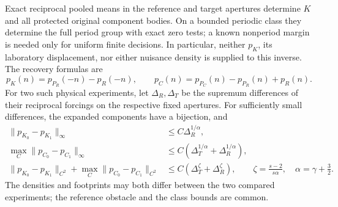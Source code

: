 \begin{theorem}
\label{thm:reference-exact}
Exact reciprocal pooled means in the reference and target apertures
determine $K$ and all protected original component bodies. On a
bounded periodic class they determine the full period group with exact
zero tests; a known nonperiod margin is needed only for uniform finite
decisions. In particular, neither $p_K$, its laboratory displacement,
nor either nuisance density is supplied to this inverse. The recovery
formulas are
\begin{equation}\label{eq:reference-subtraction}
 p_K(n)=p_{P_R}(-n)-p_R(-n),\qquad
 p_C(n)=p_{P_C}(n)-p_{P_R}(n)+p_R(n).
\end{equation}
For two such physical experiments, let $\Delta_R,\Delta_T$ be the
supremum differences of their reciprocal forcings on the respective
fixed apertures. For sufficiently small differences, the expanded
components have a bijection, and
\begin{align}
 \|p_{K_0}-p_{K_1}\|_\infty
       &\le C\Delta_R^{1/\alpha},\label{eq:reference-modulus-K}\\
 \max_C\|p_{C_0}-p_{C_1}\|_\infty
       &\le C(\Delta_T^{1/\alpha}+\Delta_R^{1/\alpha}),
                                           \label{eq:reference-modulus-C}\\
 \|p_{K_0}-p_{K_1}\|_{C^2}
    +\max_C\|p_{C_0}-p_{C_1}\|_{C^2}
       &\le C(\Delta_T^\zeta+\Delta_R^\zeta),\qquad
        \zeta=\frac{s-2}{s\alpha},\quad\alpha=\gamma+\frac32.
                                           \label{eq:reference-modulus-C2}
\end{align}
The densities and footprints may both differ between the two compared
experiments; the reference obstacle and the class bounds are common.
\end{theorem}
